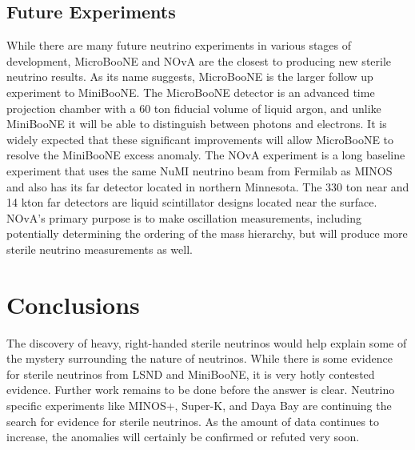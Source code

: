 \documentclass[aps,prd,twocolumn,nofootinbib]{revtex4-1}
\begin{document}
\subsection{Future Experiments}
While there are many future neutrino experiments in various stages of development, MicroBooNE and NOvA are the closest to producing new sterile neutrino results. As its name suggests, MicroBooNE is the larger follow up experiment to MiniBooNE. The MicroBooNE detector is an advanced time projection chamber with a 60 ton fiducial volume of liquid argon, and unlike MiniBooNE it will be able to distinguish between photons and electrons. It is widely expected that these significant improvements will allow MicroBooNE to resolve the MiniBooNE excess anomaly. The NOvA experiment is a long baseline experiment that uses the same NuMI neutrino beam from Fermilab as MINOS and also has its far detector located in northern Minnesota. The 330 ton near and 14 kton far detectors are liquid scintillator designs located near the surface. NOvA's primary purpose is to make oscillation measurements, including potentially determining the ordering of the mass hierarchy, but will produce more sterile neutrino measurements as well.

\section{Conclusions}
The discovery of heavy, right-handed sterile neutrinos would help explain some of the mystery surrounding the nature of neutrinos.  While there is some evidence for sterile neutrinos from LSND and MiniBooNE, it is very hotly contested evidence.  Further work remains to be done before the answer is clear.  Neutrino specific experiments like MINOS+, Super-K, and Daya Bay are continuing the search for evidence for sterile neutrinos.  As the amount of data continues to increase, the anomalies will certainly be confirmed or refuted very soon.
\end{document}
